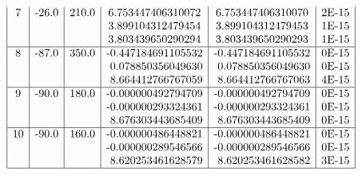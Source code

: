 \begin{description}
\begin{table}
\[\begin{array}{| c | l | l | c | c | c |}
\mbox{7} & \mbox{-26.0} & \mbox{210.0} & \mbox{6.753447406310072} & \mbox{6.753447406310070} & \mbox{2E-15}\\
\mbox{ } & \mbox{     } & \mbox{   }   & \mbox{3.899104312479454} & \mbox{3.899104312479453} & \mbox{1E-15}\\
\mbox{ } & \mbox{     } & \mbox{   }   & \mbox{3.803439650290294} & \mbox{3.803439650290293} & \mbox{1E-15}\\
\hline

\mbox{8} & \mbox{-87.0} & \mbox{350.0} & \mbox{-0.447184691105532} & \mbox{-0.447184691105532} & \mbox{0E-15}\\
\mbox{ } & \mbox{     } & \mbox{   }   & \mbox{ 0.078850356049630} & \mbox{ 0.078850356049630} & \mbox{0E-15}\\
\mbox{ } & \mbox{     } & \mbox{   }   & \mbox{ 8.664412766767059} & \mbox{ 8.664412766767063} & \mbox{4E-15}\\
\hline

\mbox{9} & \mbox{-90.0} & \mbox{180.0} & \mbox{-0.000000492794709} & \mbox{-0.000000492794709} & \mbox{0E-15}\\
\mbox{ } & \mbox{     } & \mbox{   }   & \mbox{-0.000000293324361} & \mbox{-0.000000293324361} & \mbox{0E-15}\\
\mbox{ } & \mbox{     } & \mbox{   }   & \mbox{ 8.676303443685409} & \mbox{ 8.676303443685409} & \mbox{0E-15}\\
\hline

\mbox{10} & \mbox{-90.0} & \mbox{160.0} & \mbox{-0.000000486448821} & \mbox{-0.000000486448821} & \mbox{0E-15}\\
\mbox{ }  & \mbox{     } & \mbox{   }   & \mbox{-0.000000289546566} & \mbox{-0.000000289546566} & \mbox{0E-15}\\
\mbox{ }  & \mbox{     } & \mbox{   }   & \mbox{ 8.620253461628579} & \mbox{ 8.620253461628582} & \mbox{3E-15}\\
\hline

\end{array} \]
\end{table}

\end{description}

\clearpage


